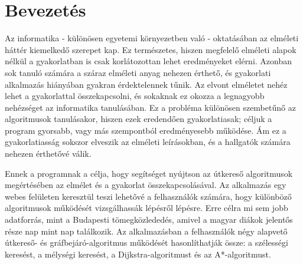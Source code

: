 \chapter{Bevezetés}
\label{ch:intro}

Az informatika - különösen egyetemi környezetben való - oktatásában az elméleti háttér kiemelkedő szerepet kap. Ez természetes, hiszen megfelelő elméleti alapok nélkül a gyakorlatban is csak korlátozottan lehet eredményeket elérni. Azonban sok tanuló számára a száraz elméleti anyag nehezen érthető, és gyakorlati alkalmazás hiányában gyakran érdektelennek tűnik. Az elvont elméletet nehéz lehet a gyakorlattal összekapcsolni, és sokaknak ez okozza a legnagyobb nehézséget az informatika tanulásában. Ez a probléma különösen szembetűnő az algoritmusok tanulásakor, hiszen ezek eredendően gyakorlatiasak; céljuk a program gyorsabb, vagy más szempontból eredményesebb működése. Ám ez a gyakorlatiasság sokszor elveszik az elméleti leírásokban, és a hallgatók számára nehezen érthetővé válik.

Ennek a programnak a célja, hogy segítséget nyújtson az útkereső algoritmusok megértésében az elmélet és a gyakorlat összekapcsolásával. Az alkalmazás egy webes felületen keresztül teszi lehetővé a felhasználók számára, hogy különböző algoritmusok működését vizsgálhassák lépésről lépésre. Erre célra mi sem jobb adatforrás, mint a Budapesti tömegközlededés, amivel a magyar diákok jelentős része nap mint nap találkozik. Az alkalmazásban a felhasználók négy alapvető útkereső- és gráfbejáró-algoritmus működését hasonlíthatják össze: a szélességi keresést, a mélységi keresést, a Dijkstra-algoritmust és az A*-algoritmust.

